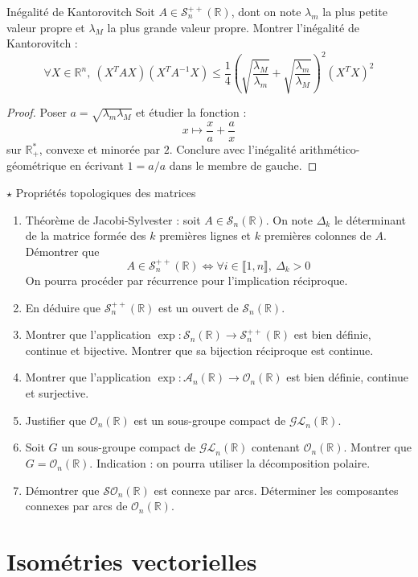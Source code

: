 \documentclass[french,a4paper]{article}
\newcommand{\R}{\mathbb{R}}
\newcommand{\st}{^*}
\newcommand{\inv}{^{-1}}
\theoremstyle{plain}
\theoremstyle{definition}
\theoremstyle{remark}
\begin{document}
\begin{ex}[X]{Inégalité de Kantorovitch}
	Soit $A\in\mathcal{S}_n^{++}(\R)$, dont on note $\lambda_m$ la plus petite valeur propre et $\lambda_M$ la plus grande valeur propre. Montrer l'inégalité de Kantorovitch : $$\forall X\in\R^n,\ (X^TAX)(X^TA\inv X)\leqslant\frac{1}{4}\left(\sqrt{\frac{\lambda_M}{\lambda_m}}+\sqrt{\frac{\lambda_m}{\lambda_M}}\right)^2(X^TX)^2$$
\end{ex}
\begin{proof}
	Poser $a=\sqrt{\lambda_m\lambda_M}$ et étudier la fonction : $$x\mapsto\frac{x}{a}+\frac{a}{x}$$ sur $\R_+\st$, convexe et minorée par $2$. Conclure avec l'inégalité arithmético-géométrique en écrivant $1=a/a$ dans le membre de gauche.
\end{proof}

\begin{ex}[Châteaux]{$\star$ Propriétés topologiques des matrices}
	\begin{enumerate}
		\item Théorème de Jacobi-Sylvester : soit $A\in\mathcal{S}_n(\R)$. On note $\Delta_k$ le déterminant de la matrice formée des $k$ premières lignes et $k$ premières colonnes de $A$. Démontrer que $$A\in\mathcal{S}_n^{++}(\R)\iff \forall i\in\llbracket1,n\rrbracket,\ \Delta_k>0$$ On pourra procéder par récurrence pour l'implication réciproque. 
		\item En déduire que $\mathcal{S}_n^{++}(\R)$ est un ouvert de $\mathcal{S}_n(\R)$.
		\item Montrer que l'application $\exp:\mathcal{S}_n(\R)\to\mathcal{S}_n^{++}(\R)$ est bien définie, continue et bijective. Montrer que sa bijection réciproque est continue.
		\item Montrer que l'application $\exp:\mathcal{A}_n(\R)\to\mathcal{O}_n(\R)$ est bien définie, continue et surjective.
		\item Justifier que $\mathcal{O}_n(\R)$ est un sous-groupe compact de $\mathcal{GL}_n(\R)$.
		\item Soit $G$ un sous-groupe compact de $\mathcal{GL}_n(\R)$ contenant $\mathcal{O}_n(\R)$. Montrer que $G=\mathcal{O}_n(\R)$. Indication : on pourra utiliser la décomposition polaire.
		\item Démontrer que $\mathcal{SO}_n(\R)$ est connexe par arcs. Déterminer les composantes connexes par arcs de $\mathcal{O}_n(\R)$.
	\end{enumerate}
\end{ex}

\section{Isométries vectorielles}
\end{document}
